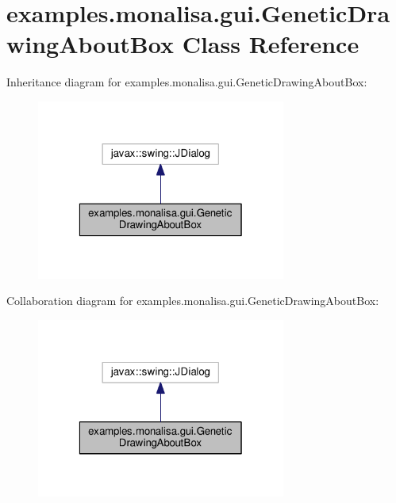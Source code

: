 \hypertarget{classexamples_1_1monalisa_1_1gui_1_1_genetic_drawing_about_box}{\section{examples.\-monalisa.\-gui.\-Genetic\-Drawing\-About\-Box Class Reference}
\label{classexamples_1_1monalisa_1_1gui_1_1_genetic_drawing_about_box}
}


Inheritance diagram for examples.\-monalisa.\-gui.\-Genetic\-Drawing\-About\-Box\-:
\nopagebreak
\begin{figure}[H]
\begin{center}
\leavevmode
\includegraphics[width=232pt]{classexamples_1_1monalisa_1_1gui_1_1_genetic_drawing_about_box__inherit__graph}
\end{center}
\end{figure}


Collaboration diagram for examples.\-monalisa.\-gui.\-Genetic\-Drawing\-About\-Box\-:
\nopagebreak
\begin{figure}[H]
\begin{center}
\leavevmode
\includegraphics[width=232pt]{classexamples_1_1monalisa_1_1gui_1_1_genetic_drawing_about_box__coll__graph}
\end{center}
\end{figure}
